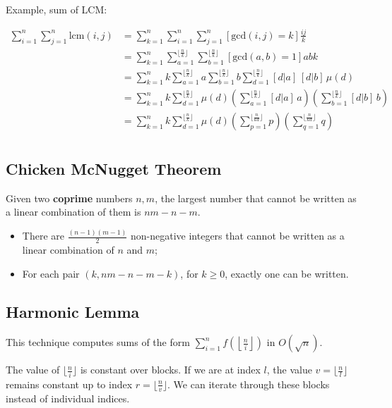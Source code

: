 Example, sum of LCM:

\begin{align*}
    \sum_{i = 1}^n \sum_{j = 1}^n \text{lcm}(i, j) &=
    \sum_{k = 1}^n\sum_{i=1}^n\sum_{j=1}^n [\text{gcd}(i, j) = k] \frac{ij}{k} \\
    &= \sum_{k = 1}^n\sum_{a=1}^{\lfloor \frac{n}{k} \rfloor}\sum_{b=1}^{\lfloor \frac{n}{k} \rfloor} [\text{gcd}(a, b) = 1] abk \\
    &= \sum_{k = 1}^n k \sum_{a=1}^{\lfloor \frac{n}{k} \rfloor} a \sum_{b=1}^{\lfloor \frac{n}{k} \rfloor} b \sum_{d=1}^{\lfloor \frac{n}{k} \rfloor}[d|a]\,[d|b] \, \mu(d) \\
    &= \sum_{k = 1}^n k \sum_{d=1}^{\lfloor \frac{n}{k} \rfloor}  \mu(d) \left(\sum_{a=1}^{\lfloor \frac{n}{k} \rfloor} [d|a] \, a\right) \left(\sum_{b=1}^{\lfloor \frac{n}{k} \rfloor} [d|b] \, b\right) \\
    &= \sum_{k = 1}^n k \sum_{d=1}^{\lfloor \frac{n}{k} \rfloor}  \mu(d) \left(\sum_{p=1}^{\lfloor \frac{n}{kd} \rfloor} p\right) \left(\sum_{q=1}^{\lfloor \frac{n}{kd} \rfloor} q\right) \\
\end{align*}

\subsection{Chicken McNugget Theorem}

Given two \textbf{coprime} numbers $n, m$, the largest number that cannot be written as a linear combination of them is $nm - n - m$.

\begin{itemize}
    \item There are $\frac{(n-1)(m-1)}{2}$ non-negative integers that cannot be written as a linear combination of $n$ and $m$;
    \item For each pair $(k, nm - n - m - k)$, for $k \geq 0$, exactly one can be written.
\end{itemize}


\subsection{Harmonic Lemma}

This technique computes sums of the form $\sum_{i=1}^{n} f\left(\left\lfloor \frac{n}{i} \right\rfloor\right)$ in $O(\sqrt{n})$.

The value of $\lfloor \frac{n}{i} \rfloor$ is constant over blocks. If we are at index $l$, the value $v = \lfloor \frac{n}{l} \rfloor$ remains constant up to index $r = \lfloor \frac{n}{v} \rfloor$. We can iterate through these blocks instead of individual indices.

